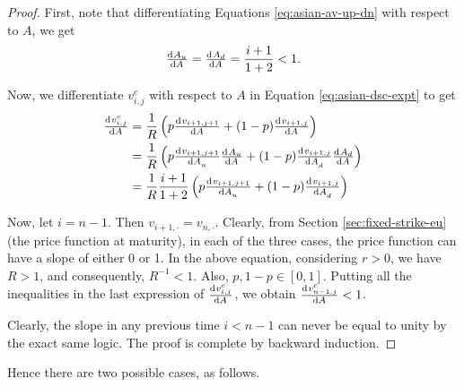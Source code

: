 \begin{proof}
	First, note that differentiating Equations \ref{eq:asian-av-up-dn} with respect to $ A $, we get
	\begin{equation*}
		\od{A_u}{A} = \od{A_d}{A} = \frac{i+1}{1+2} < 1 .
	\end{equation*}
	
	Now, we differentiate $ v_{i,j}^c $ with respect to $ A $ in Equation \ref{eq:asian-dsc-expt} to get
	\begin{align*}
		\od{v_{i,j}^c}{A}  &=  \frac{1}{R} \left(  p \od{v_{i+1,j+1}}{A} + (1 - p) \od{v_{i+1,j}}{A}  \right)  \\
		&=  \frac{1}{R} \left(  p \od{v_{i+1,j+1}}{A_u} \od{A_u}{A} + (1 - p) \od{v_{i+1,j}}{A_d} \od{A_d}{A}  \right)  \\
		&= \frac{1}{R} \frac{i+1}{1+2} \left(  p \od{v_{i+1,j+1}}{A_u} + (1 - p) \od{v_{i+1,j}}{A_d}  \right)
	\end{align*}
	
	Now, let $ i = n - 1 $. Then $ v_{i+1, \cdot} = v_{n, \cdot} $. Clearly, from Section \ref{sec:fixed-strike-eu} (the price function at maturity), in each of the three cases, the price function can have a slope of either 0 or 1. In the above equation, considering $ r > 0 $, we have $ R > 1 $, and consequently, $ R^{-1} < 1 $. Also, $ p, 1-p \in [0,1] $. Putting all the inequalities in the last expression of $ \od{v_{i,j}^c}{A} $, we obtain $ \od{v_{n-1,j}^c}{A} < 1 $.
	
	Clearly, the slope in any previous time $ i < n - 1 $ can never be equal to unity by the exact same logic. The proof is complete by backward induction.
\end{proof}


Hence there are two possible cases, as follows.

